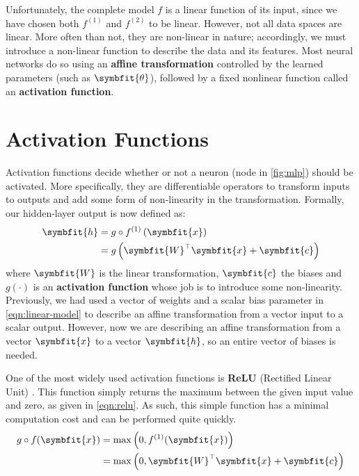 Unfortunately, the complete model $f$ is a linear function of its input, since we have chosen both $f^{(1)}$ and $f^{(2)}$ to be linear. 
However, not all data spaces are linear. More often than not, they are non-linear in nature; accordingly, we must introduce a non-linear function to describe the data and its features.
Most neural networks do so using an \textbf{affine transformation} controlled by the learned parameters (such as $\symbfit{\theta}$), followed by a fixed nonlinear function called an \textbf{activation function}.

\section{Activation Functions} \label{sec:activation-functions}

Activation functions decide whether or not a neuron (node in \cref{fig:mlp}) should be activated. More specifically, they are differentiable operators to transform inputs to outputs and add some form of non-linearity in the transformation. Formally, our hidden-layer output is now defined as:
\begin{equation}
\begin{split}
    \symbfit{h} &= g \circ f^{(1)} \left(\symbfit{x}\right)\\
                &=g\left(\symbfit{W}^{\top} \symbfit{x}+\symbfit{c}\right)
\end{split}
\end{equation}
where $\symbfit{W}$ is the linear transformation, $\symbfit{c}$ the biases and $g(\cdot)$ is an \textbf{activation function} whose job is to introduce some non-linearity. Previously, we had used a vector of weights and a scalar bias parameter in \cref{eqn:linear-model} to describe an affine transformation from a vector input to a scalar output. However, now we are describing an affine transformation from a vector $\symbfit{x}$ to a vector $\symbfit{h}$, so an entire vector of biases is needed.

One of the most widely used activation functions is \textbf{ReLU} (Rectified Linear Unit) \parencite{Fukushima1975}. This function simply returns the maximum between the given input value and zero, as given in \cref{eqn:relu}. As such, this simple function has a minimal computation cost and can be performed quite quickly.
\begin{equation}\label{eqn:relu}
    \begin{split}
        g \circ f(\symbfit{x}) & = \operatorname{max}\left(0, f^{(1)}(\symbfit{x})\right)\\
                               & = \operatorname{max}\left(0, \symbfit{W}^\top\symbfit{x} + \symbfit{c}\right)
    \end{split}
\end{equation}

